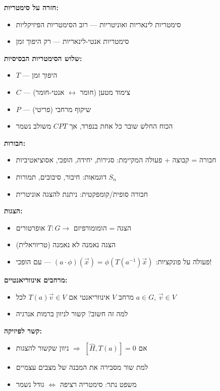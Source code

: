 \begin{summarybox}{}
\textbf{חזרה על סימטריות:}
\begin{itemize}
    \item סימטריות לינאריות ואוניטריות — רוב הסימטריות הפיזיקליות
    \item סימטריות אנטי-לינאריות — רק היפוך זמן
\end{itemize}

\textbf{שלוש הסימטריות הבסיסיות:}
\begin{itemize}
    \item $T$ — היפוך זמן
    \item $C$ — צימוד מטען (חומר $\leftrightarrow$ אנטי-חומר)
    \item $P$ — שיקוף מרחבי (פריטי)
    \item הכוח החלש שובר כל אחת בנפרד, אך $CPT$ משולב נשמר
\end{itemize}

\textbf{חבורות:}
\begin{itemize}
    \item חבורה = קבוצה + פעולה המקיימת: סגירות, יחידה, הופכי, אסוציאטיביות
    \item דוגמאות: חיבור, סיבובים, תמורות $S_n$
    \item חבורה סופית/קומפקטית: ניתנת להצגה אוניטרית
\end{itemize}

\textbf{הצגות:}
\begin{itemize}
    \item הצגה = הומומורפיזם $T: G \to$ אופרטורים
    \item הצגה נאמנה  לא נאמנה (טריוויאלית)
    \item פעולה על פונקציות: $(a \cdot \phi)(\vec{x}) = \phi(T(a^{-1})\vec{x})$ — עם הופכי!
\end{itemize}

\textbf{מרחבים אינווריאנטיים:}
\begin{itemize}
    \item מרחב $V$ אינווריאנטי אם $T(a)\vec{v} \in V$ לכל $a \in G$, $\vec{v} \in V$
    \item למה זה חשוב? קשור לניוון ברמות אנרגיה
\end{itemize}

\textbf{קשר לפיזיקה:}
\begin{itemize}
    \item אם $[\hat{H}, T(a)] = 0$ $\Rightarrow$ ניוון שקשור להצגות
    \item למת שור מסבירה את המבנה של מצבים עצמיים
    \item משפט נתר: סימטריה רציפה $\Leftrightarrow$ גודל נשמר
\end{itemize}
\end{summarybox}

